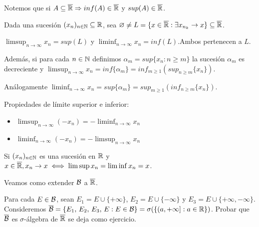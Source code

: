 Notemos que si $A \subseteq \overline{\mathbb{R}} \Rightarrow inf(A) \in \overline{\mathbb{R}}$ y $sup(A) \in \overline{\mathbb{R}}$.

Dada una sucesión $(x_n)_{n \in \mathbb{N}} \subseteq \mathbb{R}$, sea $\varnothing \neq L = \{ x \in \overline{\mathbb{R}} : \exists x_{n_k} \to x \} \subseteq \overline{\mathbb{R}}$.

\begin{definition}
    $\limsup_{n \to \infty} x_n = sup(L)$ y $\liminf_{n \to \infty} x_n = inf(L)$.Ambos pertenecen a $L$.

    Además, si para cada $n \in \mathbb{N}$ definimos $\alpha_m = sup\{ x_n : n \geq m \}$ la sucesión $\alpha_m$ es decreciente y
    $\limsup_{n \to \infty} x_n = inf\{\alpha_m\} = inf_{m \geq 1} ( sup_{n \geq m}\{x_n\} )$.

    Análogamente $\liminf_{n \to \infty} x_n = sup\{\alpha_m\} = sup_{m \geq 1} ( inf_{n \geq m}\{x_n\} )$.
\end{definition}

\begin{prop}
    Propiedades de límite superior e inferior:
    \begin{itemize}
        \item $\limsup_{n \to \infty} (- x_n) = - \liminf_{n \to \infty} x_n$
        \item $\liminf_{n \to \infty} (- x_n) = - \limsup_{n \to \infty} x_n$
    \end{itemize}
\end{prop}

\begin{note}
    Si $(x_n)_{n \in \mathbb{N}}$ es una sucesión en $\mathbb{R}$ y $x \in \overline{\mathbb{R}}, x_n \to x \iff \limsup x_n = \liminf x_n = x$.
\end{note}

Veamos como extender $\mathcal{B}$ a $\overline{\mathbb{R}}$.

\begin{definition}
    Para cada $E \in \mathcal{B}$, sean $E_1 = E \cup \{ + \infty \}$, $E_2 = E \cup \{ - \infty \}$ y $E_3 = E \cup \{ + \infty, - \infty \}$.
    Consideremos $\overline{\mathcal{B}} = \{ E_1 \text{, } E_2 \text{, } E_3 \text{, } E : E \in \mathcal{B} \} = \sigma(\{ (a, +\infty] : a \in \mathbb{R} \})$.
    Probar que $\overline{\mathcal{B}}$ es $\sigma$-álgebra de $\overline{\mathbb{R}}$ se deja como ejercicio.
\end{definition}

